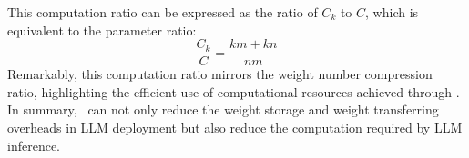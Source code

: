 This computation ratio can be expressed as the ratio of $C_k$ to $C$, which is equivalent to the parameter ratio:
\begin{equation}
    \frac{C_k}{C} = \frac{km + kn}{nm}
\end{equation}
Remarkably, this computation ratio mirrors the weight number compression ratio, highlighting the efficient use of computational resources achieved through \asvd. 
In summary, \asvd~can not only reduce the weight storage and weight transferring overheads in LLM deployment but also reduce the computation required by LLM inference. 